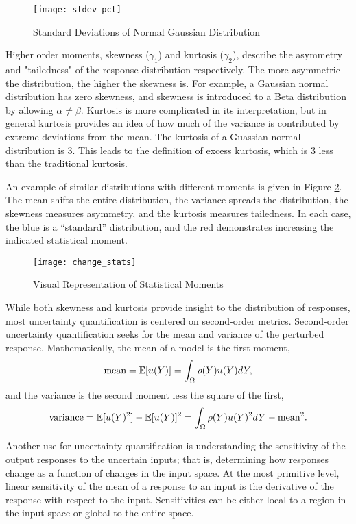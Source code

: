 \begin{figure}[H]
  \centering
  \texttt{[image: stdev\_pct]}
  \caption{Standard Deviations of Normal Gaussian Distribution}
  \label{fig:stdev pct}
\end{figure}
Higher order moments, skewness ($\gamma_1$) and kurtosis ($\gamma_2$), describe the asymmetry and "tailedness"
of the response distribution respectively.  The more asymmetric the distribution, the
higher the skewness is.  For example, a Gaussian normal distribution has zero skewness,
and skewness is introduced to a Beta distribution by allowing $\alpha\neq\beta$.
Kurtosis is more complicated in its interpretation, but in general kurtosis provides an idea
of how much of the variance is contributed by extreme deviations from the mean.  The kurtosis
of a Guassian normal distribution is 3.  This leads to the definition of excess kurtosis,
which is 3 less than the traditional kurtosis.  

An example of similar distributions with different moments is
given in Figure \ref{fig:change moments}.  The mean shifts the entire distribution, the variance spreads the
distribution, the skewness measures asymmetry, and the kurtosis measures tailedness.  In each case, the blue
is a ``standard'' distribution, and the red demonstrates increasing the indicated statistical moment.
\begin{figure}[H]
  \centering
  \texttt{[image: change\_stats]}
  \caption{Visual Representation of Statistical Moments}
  \label{fig:change moments}
\end{figure}

While both skewness and kurtosis provide insight to the distribution of responses,
most uncertainty quantification is centered on second-order metrics.
Second-order uncertainty quantification seeks for the mean and variance of
the perturbed response.  Mathematically, the mean of a model is the first moment,
\begin{equation}
  \text{mean} = \mathbb{E}[ u(Y)] = \int_\Omega \rho(Y) u(Y) dY,
\end{equation}
and the variance is the second moment less the square of the first,
\begin{equation}
  \text{variance} = \mathbb{E}[ u(Y)^2] - \mathbb{E}[ u(Y)]^2 = \int_\Omega \rho(Y) u(Y)^2 dY - \text{mean}^2.
\end{equation}
 
Another use for uncertainty quantification is understanding the sensitivity of the output responses to the
uncertain inputs; that is, determining how responses change as a function of changes in the input space.  At
the most primitive level, linear sensitivity of the mean of a response to an input is the derivative of the response
with respect to the input.  Sensitivities can be either local to a region in the input space or global
to the entire space.

